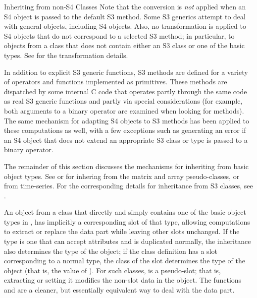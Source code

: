 \begin{Section}{Inheriting from non-S4 Classes}
Note that the conversion is \emph{not} applied when an S4 object is
passed to the default S3 method.  Some S3 generics attempt to deal
with general objects, including S4 objects.  Also, no transformation
is applied to S4 objects that do not correspond to a selected S3
method; in particular, to objects from a class that does not contain
either an S3 class or one of the basic types.  See 
for the transformation details.

In addition to explicit S3 generic functions, S3 methods are
defined for a variety of operators and functions implemented as
primitives.  These methods are dispatched by some internal C
code that operates partly through the same code as real S3
generic functions and partly via special considerations (for
example, both arguments to a binary operator are examined when
looking for methods).  The same mechanism for adapting S4
objects to S3 methods has been applied to these computations as
well, with a few exceptions such as generating an error if an S4
object that does not extend an appropriate S3 class or type is
passed to a binary operator.

The remainder of this section discusses the mechanisms for
inheriting from  basic object types. See 
or 
for inhering from the matrix and array
pseudo-classes, or from time-series.  For the
corresponding details for inheritance
from S3 classes, see .

An object from a class that directly and simply contains one
of the basic object types in \R{}, has implicitly a corresponding
 slot of that type, allowing computations to extract
or replace the data part while leaving other slots
unchanged. If the type is one that can accept attributes and is
duplicated normally, the inheritance also determines the type of the
object; if the class definition has a  slot
corresponding to a normal type, the class of the
slot determines the type of the object (that is, the value of
).
For such classes,   is a pseudo-slot; that
is, extracting or setting it modifies the non-slot data in the
object.  The functions  and
 are a cleaner, but essentially
equivalent way to deal with the data part.


\end{Section}
